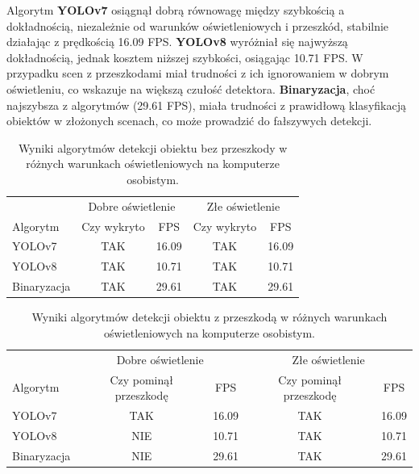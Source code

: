 \documentclass[a4paper,twoside,12pt]{book}
\begin{document}
Algorytm \textbf{YOLOv7} osiągnął dobrą równowagę między szybkością a dokładnością, niezależnie od warunków oświetleniowych i przeszkód, stabilnie działając z prędkością 16.09 FPS. \textbf{YOLOv8} wyróżniał się najwyższą dokładnością, jednak kosztem niższej szybkości, osiągając 10.71 FPS. W przypadku scen z przeszkodami miał trudności z ich ignorowaniem w dobrym oświetleniu, co wskazuje na większą czułość detektora. \textbf{Binaryzacja}, choć najszybsza z algorytmów (29.61 FPS), miała trudności z prawidłową klasyfikacją obiektów w złożonych scenach, co może prowadzić do fałszywych detekcji.

\begin{table}[h!]
    \centering
    \caption{Wyniki algorytmów detekcji obiektu bez przeszkody w różnych warunkach oświetleniowych na komputerze osobistym.}
    \label{tab:bez_przeszkody}
    \begin{tabular}{lcccc}
    \toprule
     & \multicolumn{2}{c}{Dobre oświetlenie} & \multicolumn{2}{c}{Złe oświetlenie} \\
    \cmidrule(r){2-3} \cmidrule(r){4-5}
    Algorytm & Czy wykryto & FPS & Czy wykryto & FPS \\
    \midrule
    YOLOv7 & TAK & 16.09 & TAK & 16.09 \\
    YOLOv8 & TAK & 10.71 & TAK & 10.71 \\
    Binaryzacja & TAK & 29.61 & TAK & 29.61 \\
    \bottomrule
    \end{tabular}
\end{table}

\begin{table}[h!]
    \centering
    \caption{Wyniki algorytmów detekcji obiektu z przeszkodą w różnych warunkach oświetleniowych na komputerze osobistym.}
    \label{tab:z_przeszkoda}
    \begin{tabular}{lcccc}
    \toprule
     & \multicolumn{2}{c}{Dobre oświetlenie} & \multicolumn{2}{c}{Złe oświetlenie} \\
    \cmidrule(r){2-3} \cmidrule(r){4-5}
    Algorytm & Czy pominął przeszkodę & FPS & Czy pominął przeszkodę & FPS \\
    \midrule
    YOLOv7 & TAK & 16.09 & TAK & 16.09 \\
    YOLOv8 & NIE & 10.71 & TAK & 10.71 \\
    Binaryzacja & NIE & 29.61 & TAK & 29.61 \\
    \bottomrule
    \end{tabular}
\end{table}
\end{document}

